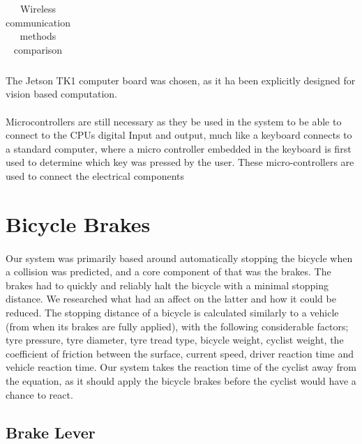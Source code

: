 \documentclass[a4paper]{report}
\begin{document}
{\begin{table}[h]
\begin{tabular}{ | m{3cm} | m{2cm} | m{3cm} | m{3cm} | m{3.5cm} | m{1cm} |}
    \end{tabular}

\caption[Table caption text]{Wireless communication methods comparison} 
\label{table:board_comp}
\end{table}

\endlandscape

The Jetson TK1 computer board was chosen, as it ha been explicitly designed for vision based computation. 

\paragraph{}Microcontrollers are still necessary as they be used in the system to be able to connect to the CPUs digital Input and output, much like a keyboard connects to a standard computer, where a micro controller embedded in the keyboard is first used to determine which key was pressed by the user. These micro-controllers are used to connect the electrical components 

\section{Bicycle Brakes}

\paragraph{}Our system was primarily based around automatically stopping the bicycle when a collision was predicted, and a core component of that was the brakes. The brakes had to quickly and reliably halt the bicycle with a minimal stopping distance. We researched what had an affect on the latter and how it could be reduced. The stopping distance of a bicycle is calculated similarly to a vehicle (from when its brakes are fully applied), with the following considerable factors; tyre pressure, tyre diameter, tyre tread type, bicycle weight, cyclist weight, the coefficient of friction between the surface, current speed, driver reaction time and vehicle reaction time. Our system takes the reaction time of the cyclist away from the equation, as it should apply the bicycle brakes before the cyclist would have a chance to react. 

\subsection{Brake Lever}
\label{sec:brake_lever}

}
\end{document}

